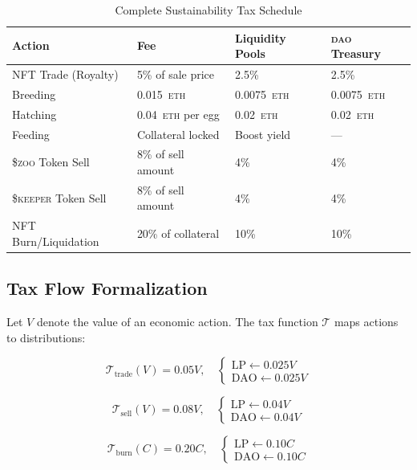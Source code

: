 \documentclass[11pt,letterpaper]{article}
\newcommand{\DAO}{\textsc{dao}}
\newcommand{\ZOO}{\$\textsc{zoo}}
\newcommand{\KEEPER}{\$\textsc{keeper}}
\newcommand{\ETH}{\textsc{eth}}
\begin{document}
\begin{table}[ht]
\centering
\caption{Complete Sustainability Tax Schedule}
\label{tab:sustainability-tax}
\begin{tabular}{@{}llll@{}}
\toprule
\textbf{Action} & \textbf{Fee} & \textbf{Liquidity Pools} & \textbf{\DAO{} Treasury} \\
\midrule
NFT Trade (Royalty) & 5\% of sale price & 2.5\% & 2.5\% \\
Breeding & 0.015~\ETH{} & 0.0075~\ETH{} & 0.0075~\ETH{} \\
Hatching & 0.04~\ETH{} per egg & 0.02~\ETH{} & 0.02~\ETH{} \\
Feeding & Collateral locked & Boost yield & --- \\
\ZOO{} Token Sell & 8\% of sell amount & 4\% & 4\% \\
\KEEPER{} Token Sell & 8\% of sell amount & 4\% & 4\% \\
NFT Burn/Liquidation & 20\% of collateral & 10\% & 10\% \\
\bottomrule
\end{tabular}
\end{table}

\subsection{Tax Flow Formalization}

Let $V$ denote the value of an economic action.  The tax function $\mathcal{T}$ maps actions to distributions:

\begin{equation}
\mathcal{T}_{\text{trade}}(V) = 0.05V, \quad
\begin{cases}
\text{LP} \leftarrow 0.025V \\
\text{DAO} \leftarrow 0.025V
\end{cases}
\label{eq:tax-trade}
\end{equation}

\begin{equation}
\mathcal{T}_{\text{sell}}(V) = 0.08V, \quad
\begin{cases}
\text{LP} \leftarrow 0.04V \\
\text{DAO} \leftarrow 0.04V
\end{cases}
\label{eq:tax-sell}
\end{equation}

\begin{equation}
\mathcal{T}_{\text{burn}}(C) = 0.20C, \quad
\begin{cases}
\text{LP} \leftarrow 0.10C \\
\text{DAO} \leftarrow 0.10C
\end{cases}
\label{eq:tax-burn}
\end{equation}
\end{document}
